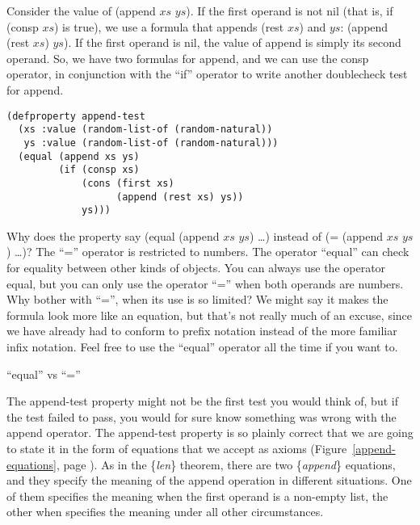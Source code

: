 Consider the value of (append $xs$ $ys$).
If the first operand is not nil (that is, if (consp $xs$) is true),
we use a formula that appends (rest $xs$) and $ys$: (append (rest $xs$) $ys$).
If the first operand is nil, the value of append
is simply its second operand.
So, we have two formulas for append, and we can use the consp operator,
in conjunction with the ``if'' operator
to write another doublecheck test for append.

\begin{samepage}
\begin{Verbatim}
(defproperty append-test
  (xs :value (random-list-of (random-natural))
   ys :value (random-list-of (random-natural)))
  (equal (append xs ys)
         (if (consp xs)
             (cons (first xs)
                   (append (rest xs) ys))
             ys)))
\end{Verbatim}
\end{samepage}

\begin{aside}
Why does the property say (equal (append $xs$ $ys$) \dots)
instead of (= (append $xs$ $ys$) \dots)?
The ``='' operator
is restricted to numbers. The operator ``equal'' can check
for equality between other kinds of objects.
You can always use the operator equal,
but you can only use the operator ``='' when both operands are numbers.
Why bother with ``='', when its use is so limited?
We might say it makes the formula look more like an equation,
but that's not really much of an excuse,
since we have already had to conform to prefix notation
instead of the more familiar infix notation.
Feel free to use the ``equal'' operator all the time if you want to.
\caption{``equal'' vs ``=''}
\label{equal}
\end{aside}

The append-test property might not be the first test you would think of,
but if the test failed to pass,
you would for sure know something was wrong with the append operator.
The append-test property is so plainly correct that
we are going to state it in the form of equations that we accept as axioms
(Figure~\ref{append-equations}, page \pageref{append-equations}).
As in the \{\emph{len}\} theorem, there are two \{\emph{append}\} equations,
and they specify the meaning of the append operation in different situations.
One of them specifies the meaning when the first operand is a non-empty list,
the other when specifies the meaning under all other circumstances.

